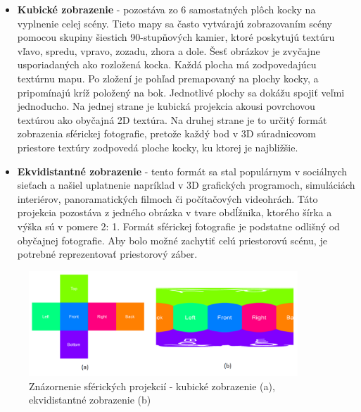 \documentclass[slovak,master,dept460,male,cpp,cpdeclaration]{diploma}
\begin{document}
\begin{itemize}
\item \textbf{Kubické zobrazenie} -  pozostáva zo 6 samostatných plôch kocky na vyplnenie celej scény. Tieto mapy sa často vytvárajú zobrazovaním scény pomocou skupiny šiestich 90-stupňových kamier, ktoré poskytujú textúru vľavo, spredu, vpravo, zozadu, zhora a dole. Šesť obrázkov je zvyčajne usporiadaných ako rozložená kocka. Každá plocha  má zodpovedajúcu textúrnu mapu. Po zložení je pohľad premapovaný na plochy kocky, a pripomínajú kríž položený na bok. Jednotlivé plochy  sa dokážu spojiť veľmi jednoducho. Na jednej strane je kubická projekcia akousi povrchovou textúrou ako obyčajná 2D textúra. Na druhej strane je to určitý formát zobrazenia sférickej fotografie, pretože každý bod v 3D súradnicovom priestore textúry zodpovedá ploche kocky, ku ktorej je najbližšie.

\item \textbf{Ekvidistantné zobrazenie} - tento formát sa stal populárnym v sociálnych sieťach a našiel uplatnenie napríklad v 3D grafických programoch, simuláciách interiérov, panoramatických filmoch či počítačových videohrách. Táto projekcia pozostáva z jedného obrázka v tvare obdĺžnika, ktorého šírka a výška sú v pomere 2: 1. Formát sférickej fotografie je podstatne odlišný od obyčajnej fotografie. Aby bolo možné zachytiť celú priestorovú scénu, je potrebné reprezentovať priestorový záber.
\end{itemize}

\begin{figure}[H]
	\centering
	\includegraphics[width=0.9\textwidth]{Figures/sphericalModel2.png}
	\caption{Znázornenie sférických projekcií - kubické zobrazenie (a), ekvidistantné zobrazenie (b)}
	\label{fig:sphericalModel2}
\end{figure}
\end{document}
